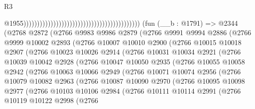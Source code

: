 \begin{lexlean}{R3}
\begin{coremodule}
                                                                                          @1955)))))))))))))))))))))))))))))))))))))))))))
    (fun (__b : @1791) =>
    @2344
      (@2768
        @2872
        (@2766
          @9983
          @9986
          @2879
          (@2766
            @9991
            @9994
            @2886
            (@2766
              @9999
              @10002
              @2893
              (@2766
                @10007
                @10010
                @2900
                (@2766
                  @10015
                  @10018
                  @2907
                  (@2766
                    @10023
                    @10026
                    @2914
                    (@2766
                      @10031
                      @10034
                      @2921
                      (@2766
                        @10039
                        @10042
                        @2928
                        (@2766
                          @10047
                          @10050
                          @2935
                          (@2766
                            @10055
                            @10058
                            @2942
                            (@2766
                              @10063
                              @10066
                              @2949
                              (@2766
                                @10071
                                @10074
                                @2956
                                (@2766
                                  @10079
                                  @10082
                                  @2963
                                  (@2766
                                    @10087
                                    @10090
                                    @2970
                                    (@2766
                                      @10095
                                      @10098
                                      @2977
                                      (@2766
                                        @10103
                                        @10106
                                        @2984
                                        (@2766
                                          @10111
                                          @10114
                                          @2991
                                          (@2766
                                            @10119
                                            @10122
                                            @2998
                                            (@2766

\end{coremodule}
\end{lexlean}
